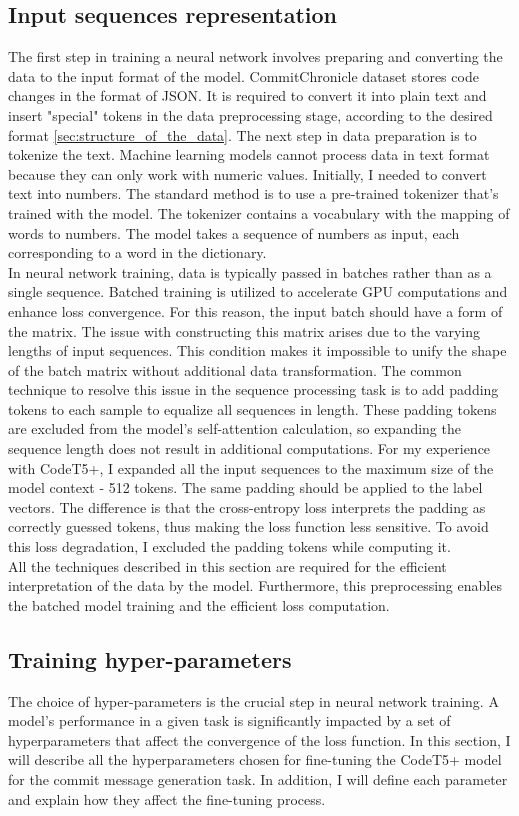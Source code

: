 \subsection{Input sequences representation}
The first step in training a neural network involves preparing and converting the data to the input format of the model. CommitChronicle dataset stores code changes in the format of JSON. It is required to convert it into plain text and insert "special" tokens in the data preprocessing stage, according to the desired format \ref{sec:structure_of_the_data}. 
The next step in data preparation is to tokenize the text. Machine learning models cannot process data in text format because they can only work with numeric values.
Initially, I needed to convert text into numbers. The standard method is to use a pre-trained tokenizer that's trained with the model. The tokenizer contains a vocabulary with the mapping of words to numbers. The model takes a sequence of numbers as input, each corresponding to a word in the dictionary. \\
In neural network training, data is typically passed in batches rather than as a single sequence. Batched training is utilized to accelerate GPU computations and enhance loss convergence. For this reason, the input batch should have a form of the matrix. The issue with constructing this matrix arises due to the varying lengths of input sequences. This condition makes it impossible to unify the shape of the batch matrix without additional data transformation. The common technique to resolve this issue in the sequence processing task is to add padding tokens to each sample to equalize all sequences in length. These padding tokens are excluded from the model's self-attention calculation, so expanding the sequence length does not result in additional computations. For my experience with CodeT5+, I expanded all the input sequences to the maximum size of the model context - 512 tokens. The same padding should be applied to the label vectors. The difference is that the cross-entropy loss interprets the padding as correctly guessed tokens, thus making the loss function less sensitive. To avoid this loss degradation, I excluded the padding tokens while computing it. \\
All the techniques described in this section are required for the efficient interpretation of the data by the model. Furthermore, this preprocessing enables the batched model training and the efficient loss computation.

\subsection{Training hyper-parameters}
The choice of hyper-parameters is the crucial step in neural network training. A model's performance in a given task is significantly impacted by a set of hyperparameters that affect the convergence of the loss function. In this section, I will describe all the hyperparameters chosen for fine-tuning the CodeT5+ model for the commit message generation task. In addition, I will define each parameter and explain how they affect the fine-tuning process.

